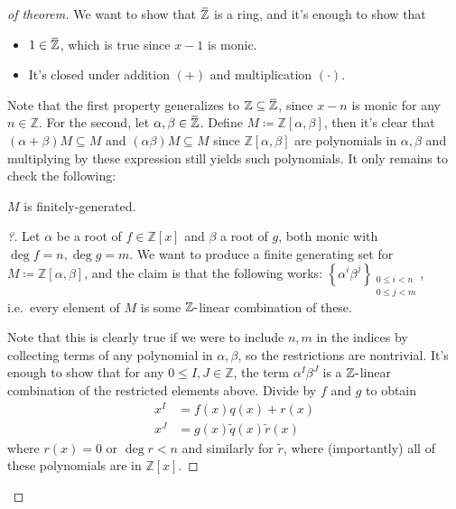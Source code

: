 \begin{proof}[of theorem]

We want to show that
\(\mkern 1.5mu\overline{\mkern-1.5mu{\mathbb{Z}}\mkern-1.5mu}\mkern 1.5mu\)
is a ring, and it's enough to show that

\begin{itemize}
\tightlist
\item
  \(1\in \mkern 1.5mu\overline{\mkern-1.5mu{\mathbb{Z}}\mkern-1.5mu}\mkern 1.5mu\),
  which is true since \(x-1\) is monic.
\item
  It's closed under addition \((+)\) and multiplication \((\cdot)\).
\end{itemize}

Note that the first property generalizes to
\({\mathbb{Z}}\subseteq \mkern 1.5mu\overline{\mkern-1.5mu{\mathbb{Z}}\mkern-1.5mu}\mkern 1.5mu\),
since \(x-n\) is monic for any \(n\in {\mathbb{Z}}\). For the second,
let
\(\alpha, \beta \in \mkern 1.5mu\overline{\mkern-1.5mu{\mathbb{Z}}\mkern-1.5mu}\mkern 1.5mu\).
Define \(M \coloneqq{\mathbb{Z}}[\alpha, \beta]\), then it's clear that
\((\alpha + \beta)M \subseteq M\) and \((\alpha \beta)M \subseteq M\)
since \({\mathbb{Z}}[\alpha, \beta]\) are polynomials in
\(\alpha, \beta\) and multiplying by these expression still yields such
polynomials. It only remains to check the following:

\begin{claim}

\(M\) is finitely-generated.

\end{claim}

\begin{proof}[?]

Let \(\alpha\) be a root of \(f \in {\mathbb{Z}}[x]\) and \(\beta\) a
root of \(g\), both monic with \(\deg f = n, \deg g = m\). We want to
produce a finite generating set for
\(M\coloneqq{\mathbb{Z}}[\alpha, \beta]\), and the claim is that the
following works:
\(\left\{{ \alpha^i \beta^j}\right\} _{\substack{0\leq i < n \\ 0 \leq j < m} }\),
i.e.~every element of \(M\) is some \({\mathbb{Z}}{\hbox{-}}\)linear
combination of these.

\hfill\break

Note that this is clearly true if we were to include \(n, m\) in the
indices by collecting terms of any polynomial in \(\alpha, \beta\), so
the restrictions are nontrivial. It's enough to show that for any
\(0 \leq I, J \in {\mathbb{Z}}\), the term \(\alpha^I \beta^J\) is a
\({\mathbb{Z}}{\hbox{-}}\)linear combination of the restricted elements
above. Divide by \(f\) and \(g\) to obtain
\begin{align*}
x^I &= f(x) q(x) + r(x) \\
x^J &= g(x) \tilde q(x) \tilde r(x)
\end{align*}
where \(r(x) = 0\) or \(\deg r < n\) and similarly for \(\tilde r\),
where (importantly) all of these polynomials are in \({\mathbb{Z}}[x]\).


\end{proof}
\end{proof}
